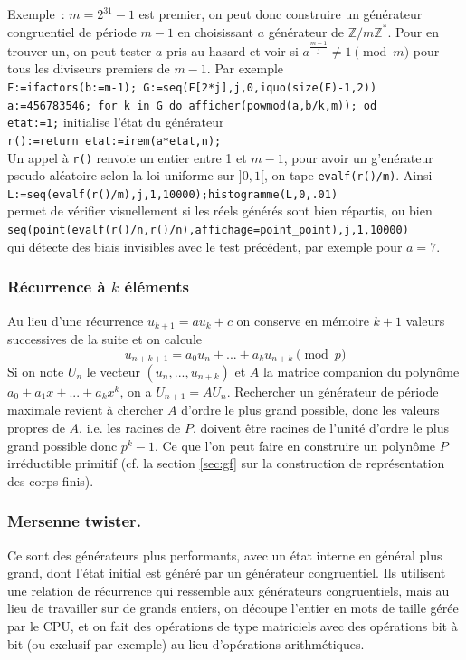 \documentclass[a4paper,11pt]{article}
\newcommand{\Z}{{\mathbb{Z}}}
\begin{document}
\begin{giacjshere}
Exemple~: $m=2^{31}-1$ est premier, on peut donc construire un
g\'en\'erateur congruentiel de p\'eriode $m-1$ en choisissant $a$
g\'en\'erateur de $\Z/m\Z^*$. Pour en trouver un, on peut tester
$a$ pris au hasard et voir si $a^{\frac{m-1}{j}} \neq 1 \pmod m$
pour tous les diviseurs premiers de $m-1$. Par exemple\\
\verb|F:=ifactors(b:=m-1); G:=seq(F[2*j],j,0,iquo(size(F)-1,2))|\\
\verb|a:=456783546; for k in G do afficher(powmod(a,b/k,m)); od|\\
\verb|etat:=1;| initialise l'\'etat du g\'en\'erateur\\
\verb|r():=return etat:=irem(a*etat,n);|\\
Un appel \`a \verb|r()| renvoie un entier entre 1 et $m-1$, pour avoir
un g'en\'erateur pseudo-al\'eatoire selon la loi uniforme sur $]0,1[$, on tape
\verb|evalf(r()/m)|.
Ainsi \\
\verb|L:=seq(evalf(r()/m),j,1,10000);histogramme(L,0,.01)|\\
permet de v\'erifier visuellement si les r\'eels g\'en\'er\'es sont
bien r\'epartis, ou bien\\
\verb|seq(point(evalf(r()/n,r()/n),affichage=point_point),j,1,10000)|\\
qui d\'etecte des biais invisibles avec le test pr\'ec\'edent, par
exemple pour $a=7$.

\subsubsection{R\'ecurrence \`a $k$ \'el\'ements}
Au lieu d'une r\'ecurrence $u_{k+1}=au_k+c$ on conserve en m\'emoire
$k+1$ valeurs successives de la suite et on calcule
$$ u_{n+k+1} = a_0 u_n+...+a_{k}u_{n+k} \pmod p$$
Si on note $U_n$ le vecteur $(u_n,...,u_{n+k})$ et $A$
la matrice companion du polyn\^ome $a_0+a_1x+...+a_kx^k$,
on a $U_{n+1}=AU_n$. Rechercher un g\'en\'erateur de p\'eriode
maximale revient \`a chercher $A$ d'ordre le plus grand possible, donc
les valeurs propres de $A$, i.e. les racines de $P$, doivent \^etre
racines de l'unit\'e d'ordre le plus grand possible donc $p^k-1$. 
Ce que l'on peut faire en construire un polyn\^ome $P$ irr\'eductible
primitif (cf. la section \ref{sec:gf} sur la construction de repr\'esentation
des corps finis).

\subsubsection{Mersenne twister.}
Ce sont des générateurs plus performants, avec un état interne
en général plus grand, dont l'état initial est généré par
un générateur congruentiel. Ils utilisent une relation
de r\'ecurrence qui ressemble aux g\'en\'erateurs
congruentiels, mais au lieu de travailler sur de grands
entiers, on d\'ecoupe l'entier en mots de taille g\'er\'ee
par le CPU, et on fait des op\'erations de type matriciels
avec des op\'erations bit \`a bit (ou exclusif par exemple)
au lieu d'op\'erations arithm\'etiques.


\end{giacjshere}
\end{document}
